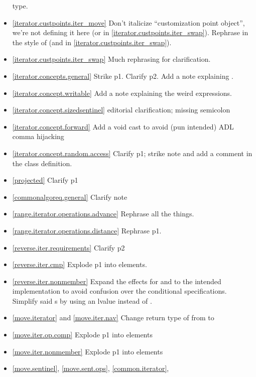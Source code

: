 \begin{itemize}
  type.
\item \ref{iterator.custpoints.iter_move} Don't italicize ``customization point
  object'', we're not defining it here
  (or in \ref{iterator.custpoints.iter_swap}). Rephrase in the style of
   (and in
  \ref{iterator.custpoints.iter_swap}).
\item \ref{iterator.custpoints.iter_swap} Much rephrasing for clarification.
\item \ref{iterator.concepts.general} Strike p1. Clarify p2.
  Add a note explaining .
\item \ref{iterator.concept.writable} Add a note explaining the weird
   expressions.
\item \ref{iterator.concept.sizedsentinel} editorial clarification;
  missing semicolon
\item \ref{iterator.concept.forward} Add a void cast to avoid (pun intended) ADL
  comma hijacking
\item \ref{iterator.concept.random.access} Clarify p1; strike note and add a
   comment in the class definition.
\item \ref{projected} Clarify p1
\item \ref{commonalgoreq.general} Clarify note
\item \ref{range.iterator.operations.advance} Rephrase all the things.
\item \ref{range.iterator.operations.distance} Rephrase p1.
\item \ref{reverse.iter.requirements} Clarify p2
\item \ref{reverse.iter.cmp} Explode p1 into \constraints elements.
\item \ref{reverse.iter.nonmember} Expand the effects for  and
   to the intended implementation to avoid confusion over the
  conditional  specifications. Simplify said s
  by using an lvalue  instead of .
\item \ref{move.iterator} and \ref{move.iter.nav} Change return type of
   from  to 
\item \ref{move.iter.op.comp} Explode p1 into \constraints elements
\item \ref{move.iter.nonmember} Explode p1 into \constraints elements
\item \ref{move.sentinel}, \ref{move.sent.ops}, \ref{common.iterator},

\end{itemize}
